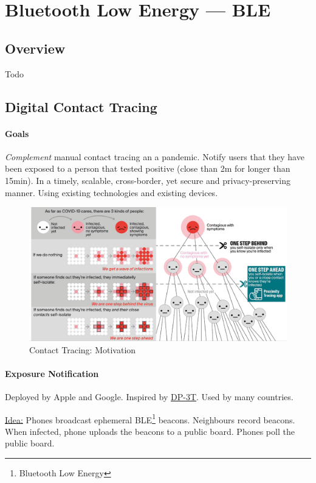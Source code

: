 \section{Bluetooth Low Energy --- BLE}

\subsection{Overview}
Todo

\subsection{Digital Contact Tracing}

\paragraph{Goals}
\textit{Complement} manual contact tracing an a pandemic.
Notify users that they have been exposed to a person that tested positive (close than 2m for longer than 15min).
In a timely, scalable, cross-border, yet secure and privacy-preserving manner.
Using existing technologies and existing devices.

\begin{figure}[h]
	\centering
	\includegraphics[scale=0.25]{images/11-why-tracing.png}
	\caption{Contact Tracing: Motivation}
	\label{fig:why-tracing}
\end{figure}

\paragraph{Exposure Notification}
Deployed by Apple and Google. Inspired by
\href{https://github.com/DP-3T/documents}{DP-3T}. Used by many countries.

\underline{Idea:}
Phones broadcast ephemeral BLE\footnote{Bluetooth Low Energy} beacons.
Neighbours record beacons.
When infected, phone uploads the beacons to a public board.
Phones poll the public board.

